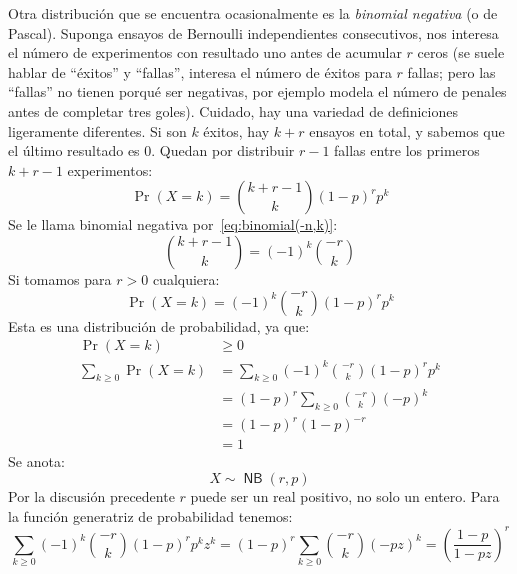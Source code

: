   Otra distribución que se encuentra ocasionalmente
  es la \emph{binomial negativa}%
  (o de Pascal).
  Suponga ensayos de Bernoulli independientes consecutivos,%
  nos interesa el número de experimentos con resultado uno
  antes de acumular \(r\) ceros
  (se suele hablar de ``éxitos'' y ``fallas'',
   interesa el número de éxitos para \(r\) fallas;
   pero las ``fallas'' no tienen porqué ser negativas,
   por ejemplo modela
   el número de penales antes de completar tres goles).
  Cuidado,
  hay una variedad de definiciones ligeramente diferentes.
  Si son \(k\) éxitos,
  hay \(k + r\) ensayos en total,
  y sabemos que el último resultado es \(0\).
  Quedan por distribuir \(r - 1\) fallas
  entre los primeros \(k + r - 1\) experimentos:
  \begin{equation}
    \label{eq:NB-distribution}
    \Pr(X = k)
      = \binom{k + r - 1}{k} (1 - p)^r p^k
  \end{equation}
  Se le llama binomial negativa por~\eqref{eq:binomial(-n,k)}:
  \begin{equation*}
    \binom{k + r - 1}{k}
      = (-1)^k \binom{-r}{k}
  \end{equation*}
  Si tomamos para \(r > 0\) cualquiera:
  \begin{equation*}
    \Pr(X = k)
      = (-1)^k \binom{-r}{k} (1 - p)^r p^k
  \end{equation*}
  Esta es una distribución de probabilidad,
  ya que:
  \begin{align*}
    \Pr(X = k)
      &\ge 0 \\
    \sum_{k \ge 0} \Pr(X = k)
      &=   \sum_{k \ge 0} (-1)^k \binom{-r}{k} (1 - p)^r p^k \\
      &=   (1 - p)^r \sum_{k \ge 0} \binom{-r}{k} (-p)^k \\
      &=   (1 - p)^r (1 - p)^{-r} \\
      &=   1
  \end{align*}
  Se anota:
  \begin{equation}
    \label{eq:distributed-NB}
    X \sim \operatorname{\boldsymbol{\mathsf{NB}}}(r, p)
  \end{equation}
  Por la discusión precedente \(r\) puede ser un real positivo,
  no solo un entero.
  Para la función generatriz de probabilidad tenemos:
  \begin{equation}
    \label{eq:PGF-NB}
    \sum_{k \ge 0} (-1)^k \binom{-r}{k} (1 - p)^r p^k z^k
      = (1 - p)^r \sum_{k \ge 0} \binom{-r}{k} (- p z)^k
      = \left( \frac{1 - p}{1 - p z} \right)^r
  \end{equation}

